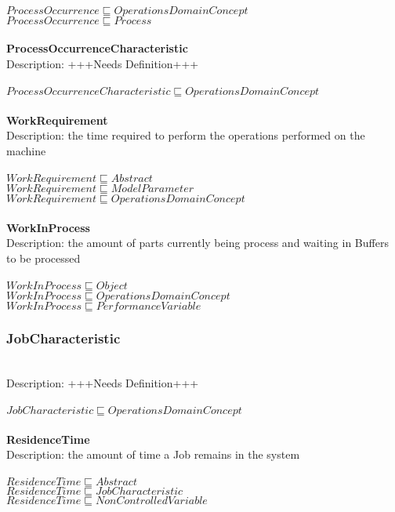 \\$ ProcessOccurrence \sqsubseteq OperationsDomainConcept$
\\$ ProcessOccurrence \sqsubseteq Process$
\\\\   \textbf{ProcessOccurrenceCharacteristic}\\Description: +++Needs Definition+++\\
\\$ ProcessOccurrenceCharacteristic \sqsubseteq OperationsDomainConcept$
\\\\   \textbf{WorkRequirement}\\Description: the time required to perform the operations performed on the machine\\
\\$ WorkRequirement \sqsubseteq Abstract$
\\$ WorkRequirement \sqsubseteq ModelParameter$
\\$ WorkRequirement \sqsubseteq OperationsDomainConcept$
\\\\   \textbf{WorkInProcess}\\Description: the amount of parts currently being process and waiting in Buffers to be processed\\
\\$ WorkInProcess \sqsubseteq Object$
\\$ WorkInProcess \sqsubseteq OperationsDomainConcept$
\\$ WorkInProcess \sqsubseteq PerformanceVariable$
\subsubsection{JobCharacteristic}\\
Description: +++Needs Definition+++\\
\\$ JobCharacteristic \sqsubseteq OperationsDomainConcept$
\\\\   \textbf{ResidenceTime}\\Description: the amount of time a Job remains in the system\\
\\$ ResidenceTime \sqsubseteq Abstract$
\\$ ResidenceTime \sqsubseteq JobCharacteristic$
\\$ ResidenceTime \sqsubseteq NonControlledVariable$
